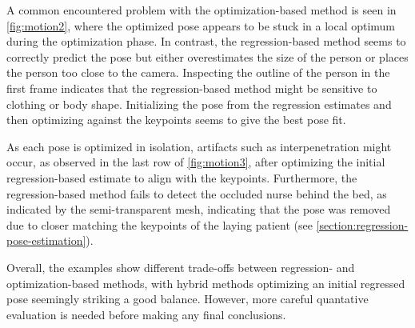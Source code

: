 A common encountered problem with the optimization-based method is seen in \cref{fig:motion2}, where the optimized pose appears to be stuck in a local optimum during the optimization phase. In contrast, the regression-based method seems to correctly predict the pose but either overestimates the size of the person or places the person too close to the camera. Inspecting the outline of the person in the first frame indicates that the regression-based method might be sensitive to clothing or body shape. Initializing the pose from the regression estimates and then optimizing against the keypoints seems to give the best pose fit. 

As each pose is optimized in isolation, artifacts such as interpenetration might occur, as observed in the last row of \cref{fig:motion3}, after optimizing the initial regression-based estimate to align with the keypoints. Furthermore, the regression-based method fails to detect the occluded nurse behind the bed, as indicated by the semi-transparent mesh, indicating that the pose was removed due to closer matching the keypoints of the laying patient (see \cref{section:regression-pose-estimation}).

Overall, the examples show different trade-offs between regression- and optimization-based methods, with hybrid methods optimizing an initial regressed pose seemingly striking a good balance. However, more careful quantative evaluation is needed before making any final conclusions. 




